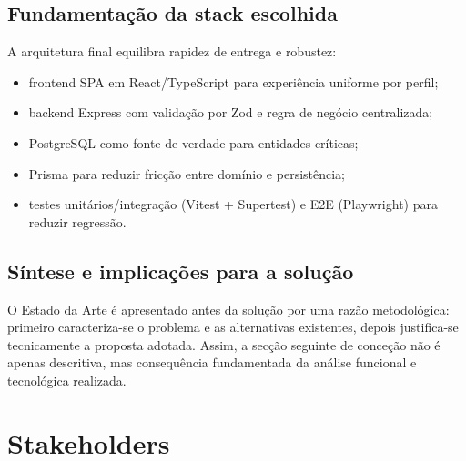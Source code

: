 \documentclass[11pt,a4paper]{article}
\begin{document}
\subsection{Fundamentação da stack escolhida}
A arquitetura final equilibra rapidez de entrega e robustez:

\begin{itemize}
  \item frontend SPA em React/TypeScript para experiência uniforme por perfil;
  \item backend Express com validação por Zod e regra de negócio centralizada;
  \item PostgreSQL como fonte de verdade para entidades críticas;
  \item Prisma para reduzir fricção entre domínio e persistência;
  \item testes unitários/integração (Vitest + Supertest) e E2E (Playwright) para reduzir regressão.
\end{itemize}

\subsection{Síntese e implicações para a solução}
O Estado da Arte é apresentado antes da solução por uma razão metodológica: primeiro caracteriza-se o problema e as alternativas existentes, depois justifica-se tecnicamente a proposta adotada. Assim, a secção seguinte de conceção não é apenas descritiva, mas consequência fundamentada da análise funcional e tecnológica realizada.

\section{Stakeholders}
\end{document}

